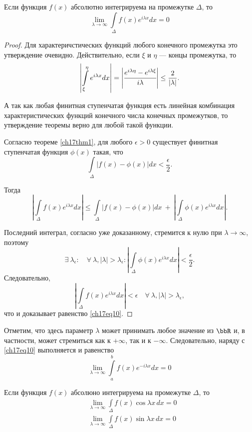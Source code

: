 \begin{thm} \label{ch17thm2}
Если функция $f(x)$ абсолютно интегрируема на промежутке $\Delta$, то
\begin{equation} \label{ch17eq10}
\lim_{\lambda \to \infty}\int\limits_{\Delta} f(x)e^{i\lambda x}dx = 0
\end{equation}
\end{thm}
\begin{proof}
Для характеричстических функций любого конечного промежутка это утверждение очевидно. Действительно, если $\xi$ и $\eta$ --- концы промежутка, то
$$
\left|\int\limits_{\xi}^{\eta} e^{i\lambda x}dx\right| = \left|\cfrac{e^{i\lambda \eta} - e^{i\lambda \xi}}{i\lambda}\right| \le \frac{2}{|\lambda|}.
$$

А так как любая финитная ступенчатая функция есть линейная комбинация характеристических функций конечного числа конечных промежутков, то утверждение теоремы верно для любой такой функции.

Согласно теореме \ref{ch17thm1}, для любого $\epsilon > 0$ существует финитная ступенчатая функция $\phi(x)$ такая, что
$$
\int\limits_{\Delta} |f(x) - \phi(x)|dx < \frac{\epsilon}{2}.
$$

Тогда
$$
\left|\int\limits_{\Delta} f(x)e^{i\lambda x}dx\right| \le \int\limits_{\Delta} |f(x) - \phi(x)|dx\ +\ \left|\int\limits_{\Delta} \phi(x)e^{i\lambda x}dx\right|.
$$

Последний интеграл, согласно уже доказанному, стремится к нулю при $\lambda \to \infty$, поэтому
$$
\exists\ \lambda_{\epsilon} : \quad \forall\ \lambda, |\lambda| > \lambda_{\epsilon} : \left|\int\limits_{\Delta} \phi(x)e^{i\lambda x}dx\right| < \frac{\epsilon}{2}.
$$
Следовательно,
$$
\left|\int\limits_{\Delta} f(x)e^{i\lambda x}dx\right| < \epsilon \quad \forall\ \lambda, |\lambda| > \lambda_{\epsilon},
$$
что и доказывает равенство \eqref{ch17eq10}.
\end{proof}

Отметим, что здесь параметр $\lambda$ может принимать любое значение из $\bbR$ и, в частности, может стремиться как к $+\infty$, так и к $-\infty$. Следовательно, наряду с \eqref{ch17eq10} выполняется и равенство
$$
\lim_{\lambda \to \infty}\int\limits_{a}^{b} f(x)e^{-i\lambda x}dx = 0
$$

\begin{cons}
Если функция $f(x)$ абсолюно интегрируема на промежутке $\Delta$, то
\begin{align*}
&\lim_{\lambda \to \infty}\int\limits_{\Delta} f(x)\cos{\lambda x}\,dx = 0\\
&\lim_{\lambda \to \infty}\int\limits_{\Delta} f(x)\sin{\lambda x}\,dx = 0
\end{align*}
\end{cons}

